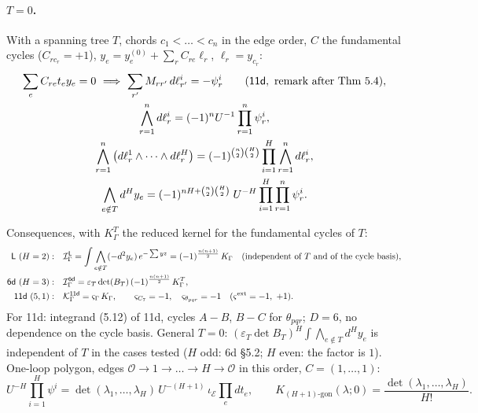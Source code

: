 \documentclass[10pt,a4paper]{article}
\numberwithin{equation}{section}
\newcommand{\cI}{\mathcal I}
\newcommand{\cK}{\mathcal K}
\newcommand{\cO}{\mathcal O}
\newcommand{\LL}[2]{\textsf{L}(#1){\scriptsize\,\texttt{#2}}}
\newcommand{\Sd}[1]{\textsf{6d}(#1)}
\newcommand{\Ed}[1]{\textsf{11d}(#1)}
\newcommand{\ptr}[2]{\par\nopagebreak{\footnotesize\raggedleft[\,#1\ $\mid$\ #2\,]\par}}
\newcommand{\st}[1]{\textsf{#1}}
\begin{document}
\paragraph{$T=0$.} With a spanning tree $T$, chords $c_1<\dots<c_n$ in the edge order, $C$ the fundamental cycles ($C_{r c_r}=+1$), $y_e=y^{(0)}_e+\sum_rC_{re}\ell_r$, $\ell_r=y_{c_r}$:
\begin{gather}
\sum_eC_{re}t_ey_e=0\ \Longrightarrow\ \sum_{r'}M_{rr'}\,d\ell^i_{r'}=-\psi^i_r\qquad(\textsf{11d},\ \text{remark after Thm 5.4}),\notag\\
\bigwedge_{r=1}^nd\ell^i_r=(-1)^nU^{-1}\prod_{r=1}^n\psi^i_r,\notag\\
\bigwedge_{r=1}^n\big(d\ell^1_r\wedge\dots\wedge d\ell^H_r\big)=(-1)^{\binom n2\binom H2}\prod_{i=1}^H\bigwedge_{r=1}^nd\ell^i_r,\notag\\
\bigwedge_{e\notin T}d^Hy_e=(-1)^{nH+\binom n2\binom H2}\;U^{-H}\prod_{i=1}^H\prod_{r=1}^n\psi^i_r .\label{eq-conv-T0}
\end{gather}
\ptr{\textsf{11d} (remark after Thm 5.4) gives ``$U^{-5}\prod_{i,r}\psi^i_r=\pm\bigwedge_{e\notin T}d^5y_e$''; sign: this compendium}{\st{D}; \path{check_conversion.py}: pointwise, exact, $H=1,\dots,6$, 15 graphs}

Consequences, with $K^T_\Gamma$ the reduced kernel for the fundamental cycles of $T$:
\begin{align}
\textsf{L}\ (H=2):&\quad\cI^{\textsf{L}}_\Gamma=\int\bigwedge_{e\notin T}(-d^2y_e)\,e^{-\sum yz}=(-1)^{\frac{n(n+1)}2}\,K_\Gamma\quad(\text{independent of }T\text{ and of the cycle basis}),\\
\textsf{6d}\ (H=3):&\quad\cI^{\textsf{6d}}_\Gamma=\varepsilon_T\det(B_T)\,(-1)^{\frac{n(n+1)}2}\,K^T_\Gamma,\\
\textsf{11d}\ (5,1):&\quad\cK^{\textsf{11d}}_\Gamma=\varsigma_\Gamma\,K_\Gamma,\qquad\varsigma_{C_7}=-1,\quad\varsigma_{\theta_{pqr}}=-1\quad(\varsigma^{\rm ext}=-1,\ +1).
\end{align}
For \textsf{11d}: integrand (5.12) of \textsf{11d}, cycles $A-B$, $B-C$ for $\theta_{pqr}$; $D=6$, no dependence on the cycle basis.
General $T=0$: $(\varepsilon_T\det B_T)^H\int\bigwedge_{e\notin T}d^Hy_e$ is independent of $T$ in the cases tested ($H$ odd: \textsf{6d} \S5.2; $H$ even: the factor is $1$).
One-loop polygon, edges $\cO\to1\to\dots\to H\to\cO$ in this order, $C=(1,\dots,1)$:
\begin{equation}
U^{-H}\prod_{i=1}^H\psi^i=\det(\lambda_1,\dots,\lambda_H)\,U^{-(H+1)}\,\iota_{\mathcal E}\prod_edt_e,\qquad K_{(H+1)\text{-gon}}(\lambda;0)=\frac{\det(\lambda_1,\dots,\lambda_H)}{H!}.
\end{equation}
\ptr{\path{check_conversion.py}}{\st{D}; pointwise exact for $H=2,\dots,6$; consistent with \Sd{6.5} ($\varepsilon_T\det B_T=-1$), \LL{5.9}{eq-1-25} (edge order $(12,13,23)$) and \Ed{6.3}}
\end{document}
